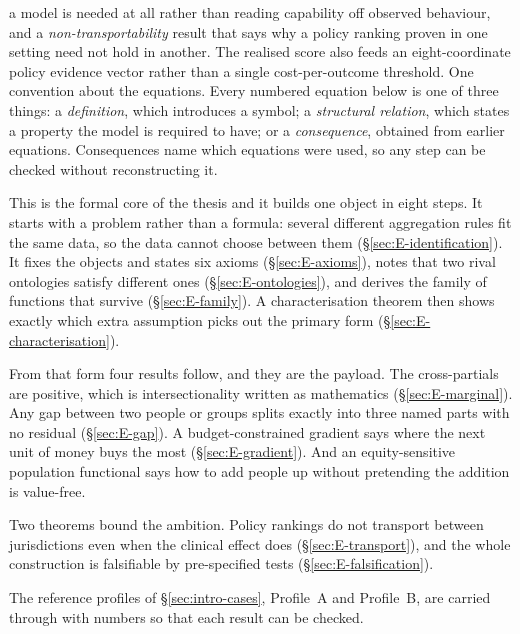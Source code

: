\begin{ataglance}
a model is needed at all rather than reading capability off observed behaviour, and a
\emph{non-transportability} result that says why a policy ranking proven in one setting
need not hold in another. The realised score also feeds an eight-coordinate policy
evidence vector rather than a single cost-per-outcome threshold.
One convention about the equations. Every numbered equation below is one of three
things: a \emph{definition}, which introduces a symbol; a \emph{structural relation},
which states a property the model is required to have; or a \emph{consequence},
obtained from earlier equations. Consequences name which equations were used, so any
step can be checked without reconstructing it.
\end{ataglance}

\begin{ataglance}
This is the formal core of the thesis and it builds one object in eight steps.
It starts with a problem rather than a formula: several different aggregation
rules fit the same data, so the data cannot choose between them
(\S\ref{sec:E-identification}). It fixes the objects and states six axioms
(\S\ref{sec:E-axioms}), notes that two rival ontologies satisfy different ones
(\S\ref{sec:E-ontologies}), and derives the family of functions that survive
(\S\ref{sec:E-family}). A characterisation theorem then shows exactly which
extra assumption picks out the primary form
(\S\ref{sec:E-characterisation}).

From that form four results follow, and they are the payload. The
cross-partials are positive, which is intersectionality written as
mathematics (\S\ref{sec:E-marginal}). Any gap between two people or groups
splits exactly into three named parts with no residual
(\S\ref{sec:E-gap}). A budget-constrained gradient says where the next unit of
money buys the most (\S\ref{sec:E-gradient}). And an equity-sensitive
population functional says how to add people up without pretending the
addition is value-free.

Two theorems bound the ambition. Policy rankings do not transport between
jurisdictions even when the clinical effect does
(\S\ref{sec:E-transport}), and the whole construction is falsifiable by
pre-specified tests (\S\ref{sec:E-falsification}).

The reference profiles of \S\ref{sec:intro-cases}, Profile~A and Profile~B,
are carried through with numbers so that each result can be checked.
\end{ataglance}

